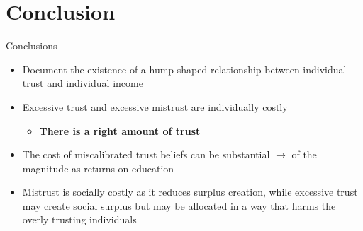 \documentclass[pdftex,12pt,xcolor=pdftex,table]{beamer}
\begin{document}
\section{Conclusion}
\begin{frame}{Conclusions}
    \begin{itemize}
        \item Document the existence of a hump-shaped relationship between individual trust and individual income
        \item Excessive trust and excessive mistrust are individually costly
        \begin{itemize}
            \item \textbf{There is a right amount of trust}
        \end{itemize} \pause
        \item The cost of miscalibrated trust beliefs can be substantial $\to$ of the magnitude as returns on education
        \item Mistrust is socially costly as it reduces surplus creation, while excessive trust may create social surplus but may be allocated in a way that harms the overly trusting individuals
    \end{itemize}
\end{frame}
\end{document}
